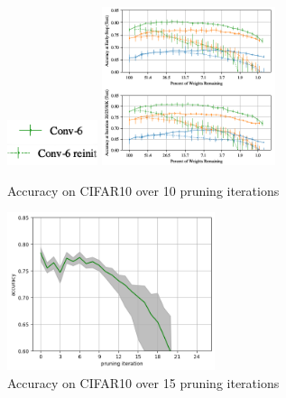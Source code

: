 \begin{figure}
	\begin{minipage}{\textwidth}
		\centering
		\includegraphics[width=100px]{gfx/7-Evaluation/LTH_4_legend.png}
	\end{minipage}
	\begin{minipage}{0.5\textwidth}
		\centering
		\includegraphics[height=175px]{gfx/7-Evaluation/LTH_CNN.png}
		\caption*{Accuracy on CIFAR10 over 10 pruning iterations}
		\label{?}
	\end{minipage}\hfill
	\begin{minipage}{0.5\textwidth}
		\centering
		\includegraphics[height=175px]{gfx/Experiments/Reproduction-CIFAR10-CNN/accuracy/LTH.png}
		\caption*{Accuracy on CIFAR10 over 15 pruning iterations}
		\label{?}
	\end{minipage}
\end{figure}

